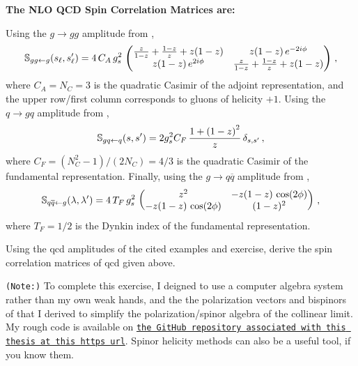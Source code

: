 \begin{answer}
       \begin{center}
        {\normalfont\Large\bfseries\sffamily The NLO QCD Spin Correlation Matrices are:}
    \end{center}


    Using the \(g \to g g\) amplitude from ,
    \begin{align}
        \label{eq:s_g_to_gg}
        \mathbb{S}_{g g \leftarrow g}(s_\ell, s_\ell')
        =
        4 \, C_A \, g_s^2
        \,
        \pmtrx{
            \frac{z}{1-z}+\frac{1-z}{z}+z(1-z)
            &
            z(1-z)\,e^{-2 i \phi}
            \\
            z(1-z)\,e^{2 i \phi}
            &
            \frac{z}{1-z}+\frac{1-z}{z}+z(1-z)
        }
        \,,
    \end{align}
    where \(C_A=N_C=3\) is the quadratic Casimir of the adjoint representation, and the upper row/first column corresponds to gluons of helicity \(+1\).
    Using the \(q \to g q\) amplitude from ,
    \begin{align}
        \label{eq:s_q_to_qg}
        \mathbb{S}_{g q \leftarrow q}(s, s')
        =
        2 g_s^2 C_F
        \,
        \frac{1 + \le(1-z\ri)^2}{z}
        \,
        \delta_{s, s'}
        \,,
    \end{align}
    where \(C_F = (N_C^2 - 1)/(2 N_C) = 4/3\) is the quadratic Casimir of the fundamental representation.
    Finally, using the \(g \to q \overline{q}\) amplitude from ,
    \begin{align}
        \label{eq:s_g_to_qq}
        \mathbb{S}_{q \overline{q} \leftarrow g}(\lambda, \lambda')
        =
        4 \, T_F \, g_s^2
        \,
        \pmtrx{
            z^2
            &
            -z(1-z)\, \cos(2\phi)
            \\
            -z(1-z)\,\cos(2\phi)
            &
            (1-z)^2
        }
        \,,
    \end{align}
    where \(T_F = 1/2\) is the Dynkin index of the fundamental representation.
\end{answer}

\begin{exercise}
    \label{ex:spin-correlation-exercise}
    Using the \gls{qcd} amplitudes of the cited examples and exercise, derive the spin correlation matrices of \gls{qcd} given above.

    \texttt{(Note:)}
    To complete this exercise, I deigned to use a computer algebra system rather than my own weak hands, and the the polarization vectors and bispinors of  that I derived to simplify the polarization/spinor algebra of the collinear limit.
    My rough code is available on \href{https://github.com/samcaf/Thesis}{\texttt{the GitHub repository associated with this thesis at this https url}}.
    Spinor helicity methods can also be a useful tool, if you know them.
\end{exercise}



